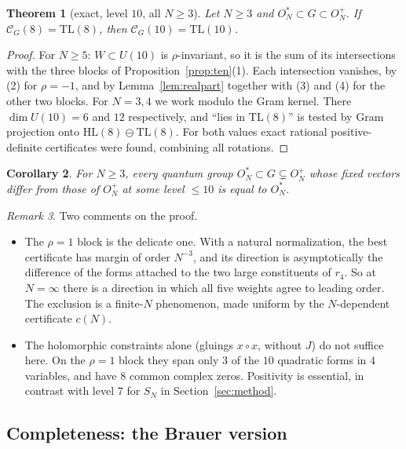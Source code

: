 \documentclass[11pt]{amsart}
\newtheorem{theorem}{Theorem}[section]
\newtheorem{corollary}[theorem]{Corollary}
\theoremstyle{definition}
\theoremstyle{remark}
\newtheorem{remark}[theorem]{Remark}
\theoremstyle{plain}
\numberwithin{equation}{section}
\numberwithin{table}{section}
\newcommand{\TL}{\mathrm{TL}}
\newcommand{\HL}{\mathrm{HL}}
\begin{document}
\begin{theorem}[exact, level $10$, all $N\ge3$]\label{thm:ten}
Let $N\ge3$ and $O_N^*\subset G\subset O_N^+$. If $\mathcal C_G(8)=\TL(8)$, then $\mathcal C_G(10)=\TL(10)$.
\end{theorem}

\begin{proof}
For $N\ge5$: $W\subset U(10)$ is $\rho$-invariant, so it is the sum of its intersections with the three blocks of
Proposition~\ref{prop:ten}(1). Each intersection vanishes, by (2) for $\rho=-1$, and by Lemma~\ref{lem:realpart} together
with (3) and (4) for the other two blocks. For $N=3,4$ we work modulo the Gram kernel. There $\dim U(10)=6$ and $12$
respectively, and ``lies in $\TL(8)$'' is tested by Gram projection onto $\HL(8)\ominus\TL(8)$. For both values exact
rational positive-definite certificates were found, combining all rotations.
\end{proof}

\begin{corollary}
For $N\ge3$, every quantum group $O_N^*\subset G\subsetneq O_N^+$ whose fixed vectors differ from those of $O_N^+$
at some level $\le10$ is equal to $O_N^*$.
\end{corollary}

\begin{remark}
Two comments on the proof.
\begin{itemize}
\item The $\rho=1$ block is the delicate one. With a natural normalization, the best certificate has margin of
order $N^{-3}$, and its direction is asymptotically the difference of the forms attached to the two large
constituents of $r_4$. So at $N=\infty$ there is a direction in which all five weights agree to leading order. The
exclusion is a finite-$N$ phenomenon, made uniform by the $N$-dependent certificate $c(N)$.
\item The holomorphic constraints alone (gluings $x\circ x$, without $J$) do not suffice here. On the $\rho=1$ block they span
only $3$ of the $10$ quadratic forms in $4$ variables, and have $8$ common complex zeros. Positivity is essential, in
contrast with level $7$ for $S_N$ in Section~\ref{sec:method}.
\end{itemize}
\end{remark}

\subsection{Completeness: the Brauer version}
\end{document}
